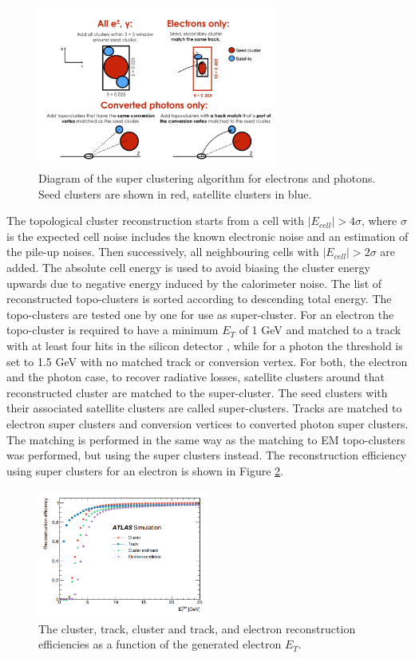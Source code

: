 \begin{figure}[H]
    \centering
    \includegraphics[width=0.7\textwidth]{Ch2/Img/Super_cluster.png}
    \caption{Diagram of the super clustering algorithm for electrons and photons. Seed clusters are shown in red, satellite clusters in blue.}
    \label{fig:chap2:Objetcs:Egamma:SC}
\end{figure}
The topological cluster reconstruction starts from a cell with $|E_{cell}| > 4\sigma$, where $\sigma$ is the expected cell noise includes the known electronic noise and an estimation of the pile-up noises. Then successively, all neighbouring cells with $|E_{cell}| > 2\sigma$ are added. The absolute cell energy is used to avoid biasing the cluster energy upwards due to negative energy induced by the calorimeter noise. The list of reconstructed topo-clusters is sorted according to descending total energy. The topo-clusters are tested one by one for use as super-cluster. For an electron the topo-cluster is required to have a minimum $E_T$ of 1 GeV and matched to a track with at least four hits in the silicon detector \cite{GSF}, while for a photon the threshold is set to 1.5 GeV with no matched track or conversion vertex. For both, the electron and the photon case, to recover radiative losses, satellite clusters around that reconstructed cluster are matched to the super-cluster. The seed clusters with their associated satellite clusters are called super-clusters. Tracks are matched to electron super clusters and conversion vertices to converted photon super clusters. The matching is performed in the same way as the matching to EM topo-clusters was performed, but using the super clusters instead. The reconstruction efficiency using super clusters for an electron is shown in Figure \ref{fig:chap2:Objects:Egamma:El_Eff}.
\begin{figure}[H]
    \centering
    \includegraphics[width=0.5\textwidth]{Ch2/Img/Electron_Reco_Eff.png}
    \caption{The cluster, track, cluster and track, and electron reconstruction efficiencies as a function of the generated electron $E_T$.}
    \label{fig:chap2:Objects:Egamma:El_Eff}
\end{figure}

